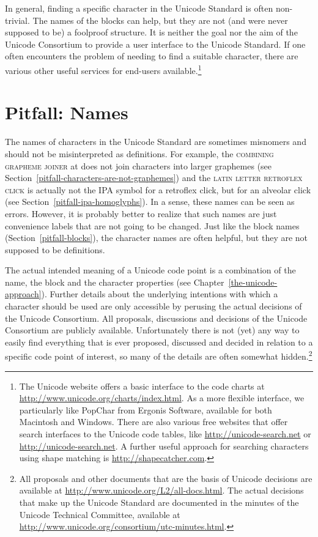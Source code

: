 In general, finding a specific character in the Unicode Standard is often non-trivial. 
The names of the blocks can help, but they are not (and were never supposed
to be) a foolproof structure. It is neither the goal nor the aim of the Unicode
Consortium to provide a user interface to the Unicode Standard. If one often
encounters the problem of needing to find a suitable character, there are
various other useful services for end-users available.\footnote{The Unicode
website offers a basic interface to the code charts at
\url{http://www.unicode.org/charts/index.html}. As a more flexible interface, we
particularly like PopChar from Ergonis Software, available for both Macintosh and
Windows. There are also various free websites that offer search interfaces
to the Unicode code tables, like \url{http://unicode-search.net} or
\url{http://unicode-search.net}. A further useful approach for searching characters
using shape matching is \url{http://shapecatcher.com}.}

\section{Pitfall: Names}
\label{pitfall-names}

The names of characters in the Unicode Standard are sometimes misnomers and
should not be misinterpreted as definitions. For example, the \textsc{combining
grapheme joiner} at  does not join characters into larger graphemes
(see Section~\ref{pitfall-characters-are-not-graphemes}) and the \textsc{latin
letter retroflex click}  is actually not the IPA symbol for a
retroflex click, but for an alveolar click (see
Section~\ref{pitfall-ipa-homoglyphs}). In a sense, these names can be seen as
errors. However, it is probably better to realize that such names are just
convenience labels that are not going to be changed. Just like the block names
(Section~\ref{pitfall-blocks}), the character names are often helpful, but they
are not supposed to be definitions.

The actual intended meaning of a Unicode code point is a combination of the
name, the block and the character properties (see
Chapter~\ref{the-unicode-approach}). Further details about the underlying intentions 
with which a character should be used
are only accessible by perusing the actual decisions of the Unicode Consortium.
All proposals, discussions and decisions of the Unicode Consortium are publicly
available. Unfortunately there is not (yet) any way to easily find everything
that is ever proposed, discussed and decided in relation to a specific
code point of interest, so many of the details are often somewhat
hidden.\footnote{All proposals and other documents that are the basis of Unicode
decisions are available at \url{http://www.unicode.org/L2/all-docs.html}. The
actual decisions that make up the Unicode Standard are documented in the minutes
of the Unicode Technical Committee, available at
\url{http://www.unicode.org/consortium/utc-minutes.html}.}


